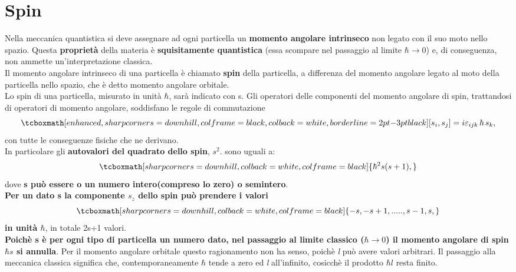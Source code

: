 \chapter{Spin}
Nella meccanica quantistica si deve assegnare ad ogni particella un \textbf{momento angolare intrinseco} non legato con il suo moto nello spazio. Questa \textbf{proprietà} della materia è \textbf{squisitamente quantistica} (essa scompare nel passaggio al limite $\hbar\rightarrow0$) e, di conseguenza, non ammette un'interpretazione classica.\\

Il momento angolare intrinseco di una particella è chiamato \textbf{spin} della particella, a differenza del momento angolare legato al moto della particella nello spazio, che è detto momento angolare orbitale.\\

Lo spin di una particella, misurato in unità $\hbar$, sarà indicato con s. Gli operatori delle componenti del momento angolare di spin, trattandosi di operatori di momento angolare, soddisfano le regole di commutazione
	\begin{equation}
		\tcboxmath[enhanced, sharp corners=downhill, colframe=black, colback=white, borderline={2pt}{-3pt}{black}]{
			[s_{i},s_{j}]=i\varepsilon_{ijk}\,\hbar\, s_{k} ,
			}
	\label{18.1}
	\end{equation}
con tutte le conseguenze fisiche che ne derivano.\\

In particolare gli \textbf{autovalori del quadrato dello spin}, $s^{2}$. sono uguali a:
	\begin{equation}
		\tcboxmath[sharp corners=downhill, colback=white, colframe=black]{
			\hbar^{2}s(s+1) ,
			}
	\end{equation}
dove \textbf{s può essere o un numero intero(compreso lo zero) o semintero}.\\

\textbf{Per un dato s la componente $s_{z}$ dello spin può prendere i valori}
	\begin{equation}
		\tcboxmath[sharp corners=downhill, colback=white, colframe=black]{
			-s, -s+1,.....,s-1,s ,
			}
	\end{equation}
\textbf{in unità $\hbar$}, in totale 2s+1 valori.\\

\textbf{Poichè s è per ogni tipo di particella un numero dato, nel passaggio al limite classico ($\hbar\rightarrow0$) il momento angolare di spin $\hbar s$ si annulla}. Per il momento angolare orbitale questo ragionamento non ha senso, poichè \textit{l} può avere valori arbitrari. Il passaggio alla meccanica classica significa che, contemporaneamente $\hbar$ tende a zero ed \textit{l} all'infinito, cosicchè il prodotto $\hbar l$ resta finito.\\

